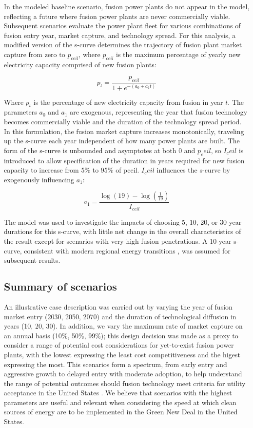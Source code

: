 \documentclass[review]{elsarticle}
\begin{document}
In the modeled baseline scenario, fusion power plants do not appear in the model, reflecting a future where fusion power plants are never commercially viable. Subsequent scenarios evaluate the power plant fleet for various combinations of fusion entry year, market capture, and technology spread. For this analysis, a modified version of the s-curve determines the trajectory of fusion plant market capture from zero to $p_{ceil}$, where $p_{ceil}$ is the maximum percentage of yearly new electricity capacity comprised of new fusion plants: 

$$p_t = \frac{p_{ceil}}{1+e^{-(a_0+a_1t)}}$$

Where $p_t$ is the percentage of new electricity capacity from fusion in year $t$. The parameters $a_0$ and $a_1$ are exogenous, representing the year that fusion technology becomes commercially viable and the duration of the technology spread period. In this formulation, the fusion market capture increases monotonically, traveling up the s-curve each year independent of how many power plants are built. The form of the s-curve is unbounded and asymptotes at both 0 and $p_ceil$, so $I_ceil$ is introduced to allow specification of the duration in years required for new fusion capacity to increase from 5\% to 95\% of pceil. $I_ceil$ influences the s-curve by exogenously influencing $a_1$:

$$a_1 = \frac{\log(19)-\log(\frac{1}{19})}{I_{ceil}}$$

The model was used to investigate the impacts of choosing 5, 10, 20, or 30-year durations for this s-curve, with little net change in the overall characteristics of the result except for scenarios with very high fusion penetrations. A 10-year s-curve, consistent with modern regional energy transitions \citep{Sovacool2016}, was assumed for subsequent results.

\subsection{Summary of scenarios}

An illustrative case description was carried out by varying the year of fusion market entry (2030, 2050, 2070) and the duration of technological diffusion in years (10, 20, 30). In addition, we vary the maximum rate of market capture on an annual basis (10\%, 50\%, 99\%); this design decision was made as a proxy to consider a range of potential cost considerations for yet-to-exist fusion power plants, with the lowest expressing the least cost competitiveness and the higest expressing the most. This scenarios form a spectrum, from early entry and aggressive growth to delayed entry with moderate adoption, to help understand the range of potential outcomes should fusion technology meet criteria for utility acceptance in the United States \citep{Kaslow1994}. We believe that scenarios with the highest parameters are useful and relevant when considering the speed at which clean sources of energy are to be implemented in the Green New Deal in the United States. 
\end{document}
